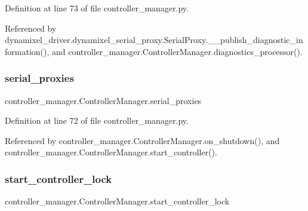 Definition at line 73 of file controller\+\_\+manager.\+py.



Referenced by dynamixel\+\_\+driver.\+dynamixel\+\_\+serial\+\_\+proxy.\+Serial\+Proxy.\+\_\+\+\_\+publish\+\_\+diagnostic\+\_\+information(), and controller\+\_\+manager.\+Controller\+Manager.\+diagnostics\+\_\+processor().

\mbox{\label{classcontroller__manager_1_1_controller_manager_adbee940432e0e6fe3f97b2eab6be6285}} 
\subsubsection{\texorpdfstring{serial\+\_\+proxies}{serial\_proxies}}
{\footnotesize\ttfamily controller\+\_\+manager.\+Controller\+Manager.\+serial\+\_\+proxies}



Definition at line 72 of file controller\+\_\+manager.\+py.



Referenced by controller\+\_\+manager.\+Controller\+Manager.\+on\+\_\+shutdown(), and controller\+\_\+manager.\+Controller\+Manager.\+start\+\_\+controller().

\mbox{\label{classcontroller__manager_1_1_controller_manager_a3c9bc2258eb592e26334d69ff9d205ec}} 
\subsubsection{\texorpdfstring{start\+\_\+controller\+\_\+lock}{start\_controller\_lock}}
{\footnotesize\ttfamily controller\+\_\+manager.\+Controller\+Manager.\+start\+\_\+controller\+\_\+lock}



